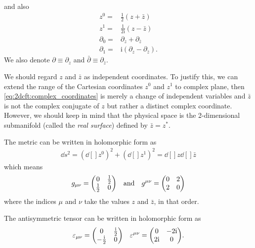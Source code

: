 \documentclass[10pt]{article}
\newcommand{\ii}{\mathrm{i}}
\begin{document}
and also
\begin{subequations}
    \begin{align}
        z^0=        & \frac{1}{2}(z+\bar{z})              \\
        z^1=        & \frac{1}{2\ii}(z-\bar{z})           \\
        \partial_0= & \partial_z+\partial_{\bar{z}}       \\
        \partial_1= & \ii(\partial_z-\partial_{\bar{z}}).
    \end{align}
\end{subequations}
We also denote $\partial\equiv \partial_z$ and $\bar{\partial}\equiv\partial_{\bar{z}}$.
\begin{remark}
    We should regard $z$ and $\bar{z}$ as independent coordinates.
    To justify this, we can extend the range of the Cartesian coordinates $z^0$ and $z^1$ to complex plane, then \cref{eq:2dcft:complex_coordinates} is merely a change of independent variables and $\bar{z}$ is not the complex conjugate of $z$ but rather a distinct complex coordinate.
    However, we should keep in mind that the physical space is the 2-dimensional submanifold (called the \textit{real surface}) defined by $\bar{z}=z^\ast$.
\end{remark}

The metric can be written in holomorphic form as
\begin{align}
    \dd{s^2}=(\dd[]{z^0})^2+(\dd[]{z^1})^2=\dd[]{z}\dd[]{\bar{z}}
\end{align}
which means
\begin{align}
    g_{\mu\nu}=\mqty(0 & \frac{1}{2} \\\frac{1}{2}&0)\qand g^{\mu\nu}=\mqty(0&2\\2&0)\label{eq:2dcft:metric_complex}
\end{align}
where the indices $\mu$ and $\nu$ take the values $z$ and $\bar{z}$, in that order.

The antisymmetric tensor can be written in holomorphic form as
\begin{align}
    \varepsilon_{\mu\nu}=\mqty(0 & \frac{\ii}{2} \\-\frac{\ii}{2}&0)\quad\varepsilon^{\mu\nu}=\mqty(0&-2\ii\\2\ii&0).
\end{align}
\end{document}
